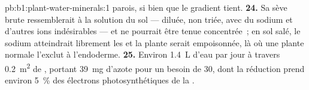 \begin{solution}{pb:b1:plant-water-minerals:1}
parois, si bien que le gradient tient.
\textbf{24.} Sa sève brute ressemblerait à la solution du sol ---
diluée, non triée, avec du sodium et d'autres ions indésirables --- et
ne pourrait être tenue concentrée~; en sol salé, le sodium atteindrait
librement les  et la plante serait empoisonnée, là où une
plante normale l'exclut à l'endoderme.
\textbf{25.} Environ \qty{1.4}{L} d'eau par jour à travers
\qty{0.2}{m^2} de , portant \qty{39}{mg} d'azote pour un besoin
de \qty{30}{}, dont la réduction prend environ \qty{5}{\%} des
électrons photosynthétiques de la .
\end{solution}
